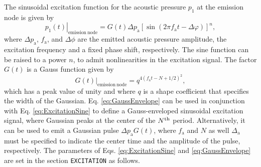 The sinusoidal excitation function for the acoustic pressure $p_1$ at the emission node is given by
\begin{equation}
\left.p_1\left(t\right)\right|_{\mathrm{emission\:node}} = G\left(t\right)\Delta p_{\mathrm{a}}\left[\sin\left(2\pi f_{\mathrm{a}}t - \Delta \varphi\right)\right]^n,
\label{eq:ExcitationSine}
\end{equation}
where $\Delta p_{\mathrm{a}}$, $f_{\mathrm{a}}$, and $\Delta \phi$ are the emitted acoustic pressure amplitude, the excitation frequency and a fixed phase shift, respectively. The sine function can be raised to a power $n$, to admit nonlinearities in the excitation signal. The factor $G\left(t\right)$ is a Gauss function given by
\begin{equation}
\left.G\left(t\right)\right|_{\mathrm{emission\:node}} = q^{4\left(f_{\mathrm{a}}t - N + 1/2\right)^2},
\label{eq:GaussEnvelope}
\end{equation}
which has a peak value of unity and where $q$ is a shape coefficient that specifies the width of the Gaussian. Eq. \eqref{eq:GaussEnvelope} can be used in conjunction with Eq. \eqref{eq:ExcitationSine} to define a Gauss-enveloped sinusoidal excitation signal, where Gaussian peaks at the center of the $N^{\textnormal{th}}$ period. Alternatively, it can be used to emit a Gaussian pulse $\Delta p_{\mathrm{a}}G\left(t\right)$, where $f_{\mathrm{a}}$ and $N$ as well $\Delta _{\mathrm{a}}$ must be specified to indicate the center time and the amplitude of the pulse, respectively. The parameters of Eqs. \eqref{eq:ExcitationSine} and \eqref{eq:GaussEnvelope} are set in the section {\tt EXCITATION} as follows.

